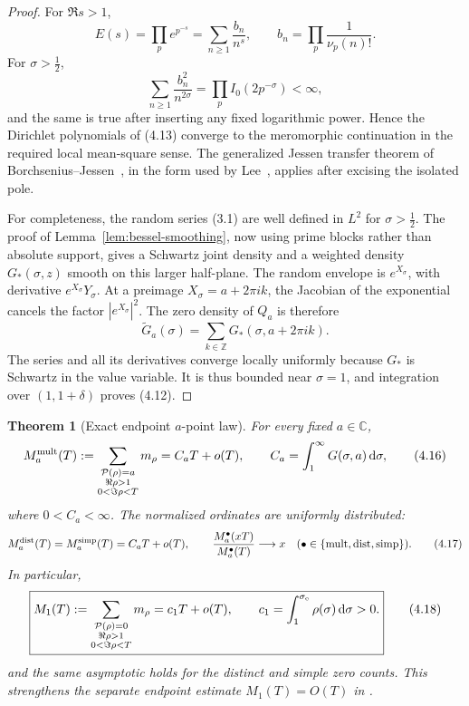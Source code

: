 \documentclass[11pt]{article}
\newtheorem{theorem}{Theorem}[section]
\theoremstyle{definition}
\theoremstyle{remark}
\newcommand{\cP}{\mathcal P}
\newcommand{\dd}{\,\mathrm d}
\newcommand{\C}{\mathbb C}
\begin{document}
\begin{proof}
For $\Re s>1$,
\[
 E(s)=\prod_pe^{p^{-s}}=\sum_{n\ge1}\frac{b_n}{n^s},
 \qquad
 b_n=\prod_p\frac1{\nu_p(n)!}.
\tag{4.13}
\]
For $\sigma>\tfrac12$,
\[
 \sum_{n\ge1}\frac{b_n^2}{n^{2\sigma}}
 =\prod_p I_0(2p^{-\sigma})<\infty,
\tag{4.14}
\]
and the same is true after inserting any fixed logarithmic power.  Hence the Dirichlet
polynomials of (4.13) converge to the meromorphic continuation in the required local
mean-square sense.  The generalized Jessen transfer theorem of
Borchsenius--Jessen~\cite{BorchseniusJessen1948}, in the form used by
Lee~\cite[Theorem 3.1]{Lee2014}, applies after excising the isolated pole.

For completeness, the random series (3.1) are well defined in $L^2$ for
$\sigma>\tfrac12$.  The proof of Lemma~\ref{lem:bessel-smoothing}, now using prime
blocks rather than absolute support, gives a Schwartz joint density and a weighted
density $G_*(\sigma,z)$ smooth on this larger half-plane.  The random envelope is
$e^{X_\sigma}$, with derivative $e^{X_\sigma}Y_\sigma$.  At a preimage
$X_\sigma=a+2\pi ik$, the Jacobian of the exponential cancels the factor
$|e^{X_\sigma}|^2$.  The zero density of $Q_a$ is therefore
\[
 \widetilde G_a(\sigma)=
 \sum_{k\in\mathbb Z}G_*(\sigma,a+2\pi ik).
\tag{4.15}
\]
The series and all its derivatives converge locally uniformly because $G_*$ is
Schwartz in the value variable.  It is thus bounded near $\sigma=1$, and integration
over $(1,1+\delta)$ proves (4.12).
\end{proof}

\begin{theorem}[Exact endpoint $a$-point law]
\label{thm:endpoint}
For every fixed $a\in\C$,
\[
 M_a^{\rm mult}(T):=
 \sum_{\substack{\cP(\rho)=a\\\Re\rho>1\\0<\Im\rho<T}}m_\rho
 =C_aT+o(T),
 \qquad
 C_a=\int_1^\infty G(\sigma,a)\dd\sigma,
\tag{4.16}
\]
where $0<C_a<\infty$.  The normalized ordinates are uniformly distributed:
\[
 M_a^{\rm dist}(T)=M_a^{\rm simp}(T)=C_aT+o(T),
 \qquad
 \frac{M_a^\bullet(xT)}{M_a^\bullet(T)}\longrightarrow x
 \quad(\bullet\in\{\mathrm{mult},\mathrm{dist},\mathrm{simp}\}).
\tag{4.17}
\]
In particular,
\[
 \boxed{
 M_1(T):=
 \sum_{\substack{\cP(\rho)=0\\\Re\rho>1\\0<\Im\rho<T}}m_\rho
 =c_1T+o(T),
 \qquad
 c_1=\int_1^{\sigma_{\rm e}}\rho(\sigma)\dd\sigma>0.
 }
\tag{4.18}
\]
and the same asymptotic holds for the distinct and simple zero counts.
This strengthens the separate endpoint estimate $M_1(T)=O(T)$ in
\cite{BCS2025}.
\end{theorem}
\end{document}
